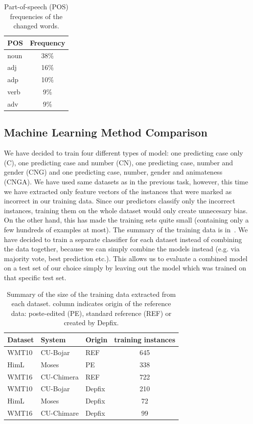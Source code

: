 \begin{table}[t]
\centering
\small

\begin{tabular}{lc}
POS  &  Frequency  \\
\hline
noun    &   38\%  \\
adj     &   16\%  \\
adp     &   10\%  \\
verb    &   9\%  \\
adv     &   9\%  \\
\end{tabular}
\caption{
    Part-of-speech (POS) frequencies of the changed words.
}
\label{changes-pos}
\end{table}


\subsection{Machine Learning Method Comparison}

We have decided to train four different types of model: one predicting case only (C), one predicting case and number (CN),
 one predicting case, number and gender (CNG) and one predicting case, number, gender and animateness (CNGA).
We have used same datasets as in the previous task, however, this
time we have extracted only feature vectors of the instances that were marked as incorrect in our training data. Since
our predictors classify only the incorrect instances, training them on the whole dataset would only create
unnecesary bias. On the other hand, this has made the training sets quite small (containing only a few hundreds of examples
at most). The summary of the training data is in~. We have decided to train a separate classifier
for each dataset instead of combining the data together, because we can simply combine the models instead (e.g. via majority
vote, best prediction etc.). This allows us to evaluate a combined model on a test set of our choice simply by leaving
out the model which was trained on that specific test set.

\begin{table}[t]
\centering
\small

\begin{tabular}{lll|c}
Dataset  &  System  &  Origin  &  \hash{} training instances  \\
\hline
WMT10  &  CU-Bojar  &  REF  &  645  \\
HimL  &   Moses  &  PE  & 338  \\
WMT16  &  CU-Chimera  &  REF  &  722  \\
WMT10  &  CU-Bojar  &  Depfix  &  210  \\
HimL  &  Moses  &  Depfix  &  72  \\
WMT16  &  CU-Chimare  &  Depfix  &  99  \\
\end{tabular}
\caption{
    Summary of the size of the training data extracted from each dataset.
	 column indicates origin
	of the reference data: poste-edited (PE), standard reference (REF) or created by Depfix.
}
\label{cats-training-sum}
\end{table}

